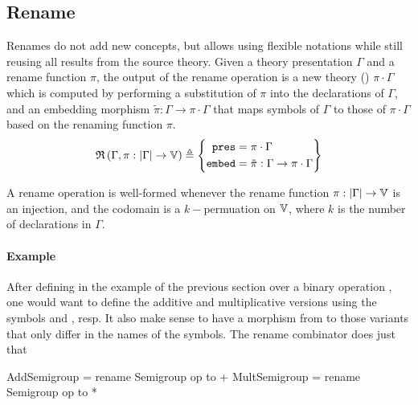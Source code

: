 \subsection{Rename}
\label{subsec:rename}
Renames do not add new concepts, but allows using flexible notations while still reusing all results from the source theory. 
Given a theory presentation $\Gamma$ and a rename function $\pi$, the output of the rename operation is a new theory () $\pi \cdot \Gamma$ which is computed by performing a substitution of $\pi$ into the declarations of $\Gamma$, and an embedding morphism $\tilde{\pi} : \Gamma \to \pi\cdot\Gamma$ that maps symbols of $\Gamma$ to those of $\pi\cdot\Gamma$ based on the renaming function $\pi$. 
\[ \mathfrak{R}\left(\Gamma, \pi : \left| \Gamma \right| \rightarrow \mathbb{V}\right) \triangleq \left\{\begin{aligned} \mathtt{pres} & = \pi \cdot \Gamma \\ \mathtt{embed} & = \tilde{\pi}:\Gamma \rightarrow \pi\cdot\Gamma \end{aligned}\right\} \]

A rename operation is well-formed whenever the rename function $\pi : |\Gamma| \to \mathbb{V}$ is an injection, and the codomain is a $k-$permuation on $\mathbb{V}$, where $k$ is the number of declarations in $\Gamma$. 

\paragraph{Example}
After defining  in the example of the previous section over a binary operation , one would want to define the additive and multiplicative versions using the symbols \lstmath{+} and \lstmath{*}, resp. It also make sense to have a morphism from  to those variants that only differ in the names of the symbols. The rename combinator does just that 
\begin{togcode}
AddSemigroup  = rename Semigroup {op to +} 
MultSemigroup = rename Semigroup {op to *} 
\end{togcode}  

